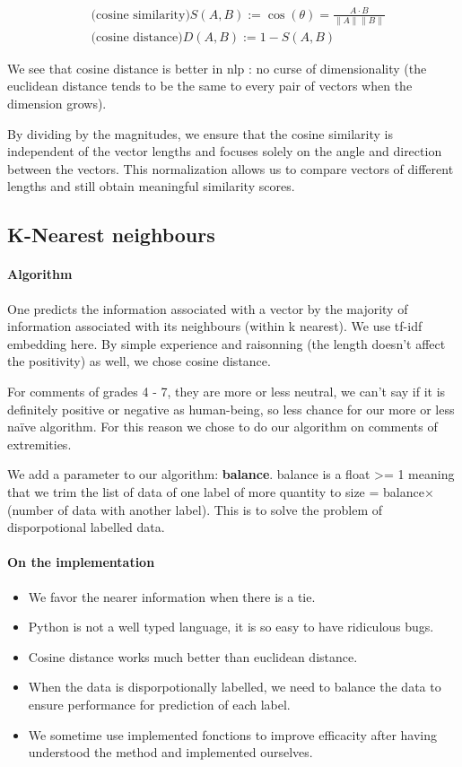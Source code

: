 \documentclass{article}
\begin{document}
$$
\begin{aligned}
&\text{(cosine similarity)}S(A, B) :=
\cos (\theta)=\frac{A \cdot B}{\|A\|\|B\|}\\
&\text{(cosine distance)}D(A, B) :=1-S(A, B)
\end{aligned}
$$

We see that cosine distance is better in nlp : no curse of dimensionality (the euclidean
distance tends to be the same to every pair of vectors when the dimension grows).

By dividing by the magnitudes, we ensure that the cosine similarity is independent of the vector lengths and focuses solely on the angle and direction between the vectors. This normalization allows us to compare vectors of different lengths and still obtain meaningful similarity scores.

\subsection{K-Nearest neighbours}
\label{subset:KNN}

\paragraph{Algorithm} One predicts the information associated with a vector by the majority
of information associated with its neighbours (within k nearest).
We use tf-idf embedding here.
By simple experience
and raisonning (the length doesn't affect the positivity) as well, we chose cosine distance.

For comments of grades 4 - 7, they are more or less neutral, we can't
say if it is definitely positive or negative as human-being, so less chance
for our more or less naïve algorithm. For this reason we chose
to do our algorithm on comments of extremities.

We add a parameter to our algorithm: \textbf{balance}.
balance is a float >= 1 meaning that we trim the list of data of one label
of more quantity to size = balance$\times$(number of data with another label).
This is to solve the problem of disporpotional labelled data.

\paragraph{On the implementation} \begin{itemize}
  \item We favor the nearer information when there is a tie.
  \item Python is not a well typed language, it is so easy to have
  ridiculous bugs.
  \item Cosine distance works much better than euclidean distance.
  \item When the data is disporpotionally labelled, we need to balance the data to ensure performance for prediction of each label.
  \item We sometime use implemented fonctions to improve
  efficacity after having understood the method and
  implemented ourselves.
\end{itemize}
\end{document}
